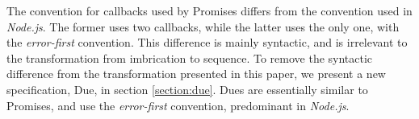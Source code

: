 The convention for callbacks used by Promises differs from the convention used in \textit{Node.js}.
The former uses two callbacks, while the latter uses the only one, with the \textit{error-first} convention.
This difference is mainly syntactic, and is irrelevant to the transformation from imbrication to sequence.
To remove the syntactic difference from the transformation presented in this paper, we present a new specification, Due, in section \ref{section:due}.
Dues are essentially similar to Promises, and use the \textit{error-first} convention, predominant in \textit{Node.js}.





